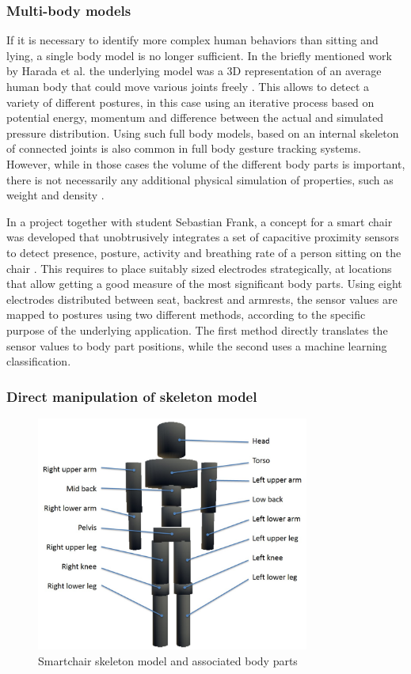 \subsubsection{Multi-body models}
If it is necessary to identify more complex human behaviors than sitting and lying, a single body model is no longer sufficient. In the briefly mentioned work by Harada et al. the underlying model was a 3D representation of an average human body that could move various joints freely \cite{harada2000human}. This allows to detect a variety of different postures, in this case using an iterative process based on potential energy, momentum and difference between the actual and simulated pressure distribution. Using such full body models, based on an internal skeleton of connected joints is also common in full body gesture tracking systems. However, while in those cases the volume of the different body parts is important, there is not necessarily any additional physical simulation of properties, such as weight and density \cite{Shotton2013}. 

In a project together with student Sebastian Frank, a concept for a smart chair was developed that unobtrusively integrates a set of capacitive proximity sensors to detect presence, posture, activity and breathing rate of a person sitting on the chair \cite{Braun2013ChairAid}. This requires to place suitably sized electrodes strategically, at locations that allow getting a good measure of the most significant body parts. Using eight electrodes distributed between seat, backrest and armrests, the sensor values are mapped to postures using two different methods, according to the specific purpose of the underlying application. The first method directly translates the sensor values to body part positions, while the second uses a machine learning classification.

\subsubsection*{Direct manipulation of skeleton model}
\begin{figure}[ht]
\centering
\includegraphics[width=0.8\textwidth]{images/smartchair_skeleton_model}
\caption{Smartchair skeleton model and associated body parts}
\label{fig:smartchair_skeleton_model}
\end{figure}


